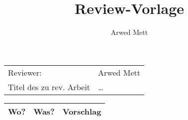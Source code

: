 \documentclass{article}
\author{Arwed Mett}
\title{Review-Vorlage}
\begin{document}
\maketitle
\begin{center}
\begin{tabularx}{5cm}{ll}
    Reviewer: & Arwed Mett\\
    Titel des zu rev. Arbeit & \ldots\\
\end{tabularx}
\vspace{1cm}
\end{center}
\begin{tabularx}{\textwidth}{|X|X|X|}
    \hline
    \textbf{Wo?} & \textbf{Was?} & \textbf{Vorschlag}\\
    \hline
\end{tabularx}
\end{document}
